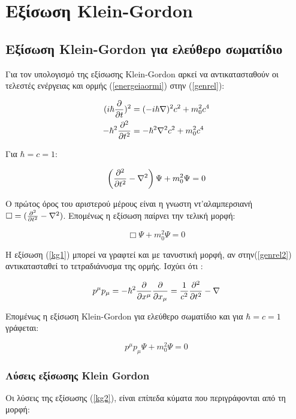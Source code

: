 \section{Εξίσωση \textlatin{Klein-Gordon}}
\subsection{Εξίσωση \textlatin{Klein-Gordon} για ελεύθερο σωματίδιο}
Για τον υπολογισμό της εξίσωσης \textlatin{Klein-Gordon} αρκεί να αντικατασταθούν οι τελεστές ενέργειας και ορμής (\ref{energeiaormi}) στην (\ref{genrel}): 

\begin{align}
 \notag (i\hbar \frac{\partial }{\partial t} )^2 &= (-i\hbar \nabla)^2 c^2 +m_0 ^2 c^4
  \\ -\hbar^2 \frac{\partial ^2}{\partial t^2} &= -\hbar^2 \nabla^2 c^2 +m_0^2 c^4 
  \label{kg1} 
\end{align}

Για $\hbar=c=1$: 

\[
\left(  \frac{\partial ^2}{\partial t^2}-\nabla^2 \right)  \Psi +m_0^2 \Psi = 0
\]

Ο πρώτος όρος του αριστερού μέρους είναι η γνωστη ντ'αλαμπερσιανή $\Box = (\frac{\partial ^2}{\partial t^2}-\nabla^2) $. Επομένως η εξίσωση παίρνει την τελική μορφή: 

\[
  \Box \Psi +m_0^2 \Psi = 0  
\]

Η εξίσωση (\ref{kg1}) μπορεί να γραφτεί και με τανυστική μορφή, αν στην(\ref{genrel2})  αντικατασταθεί το τετραδιάνυσμα της ορμής. Ισχύει ότι : 

\[ 
{p}^\mu {p}_\mu=-\hbar^2 \frac{\partial }{\partial x^\mu}\frac{\partial }{\partial x_\mu}=\frac{1}{c^2} \frac{\partial ^2}{\partial t^2} -\nabla
\]

Επομένως η εξίσωση \textlatin{Klein-Gordon} για ελεύθερο σωματίδιο και για $\hbar = c = 1 $ γράφεται: 

\begin{equation}
  {p}^\mu {p}_\mu \Psi + m_0^2 \Psi=0 
  \label{kg2}
\end{equation}

\subsubsection{Λύσεις εξίσωσης \textlatin{Klein Gordon}}
Οι λύσεις της εξίσωσης (\ref{kg2}), είναι επίπεδα κύματα που περιγράφονται από τη μορφή:

